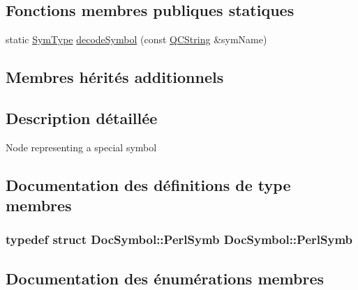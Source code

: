 \subsection*{Fonctions membres publiques statiques}
\begin{DoxyCompactItemize}
\item 
static \hyperlink{class_doc_symbol_abea9ba345564542cc6b65ae4c76be6c2}{Sym\+Type} \hyperlink{class_doc_symbol_ae9924eba60c6ee0590b1fa8be11a7b0e}{decode\+Symbol} (const \hyperlink{class_q_c_string}{Q\+C\+String} \&sym\+Name)
\end{DoxyCompactItemize}
\subsection*{Membres hérités additionnels}


\subsection{Description détaillée}
Node representing a special symbol 

\subsection{Documentation des définitions de type membres}
\hypertarget{class_doc_symbol_af5533835fd3653c5f05411a0d9930d4c}{}
\subsubsection[{Perl\+Symb}]{\setlength{\rightskip}{0pt plus 5cm}typedef struct {\bf Doc\+Symbol\+::\+Perl\+Symb} {\bf Doc\+Symbol\+::\+Perl\+Symb}}\label{class_doc_symbol_af5533835fd3653c5f05411a0d9930d4c}


\subsection{Documentation des énumérations membres}
\hypertarget{class_doc_symbol_a513eebcda007c5999064ab5de1d1e847}{}
